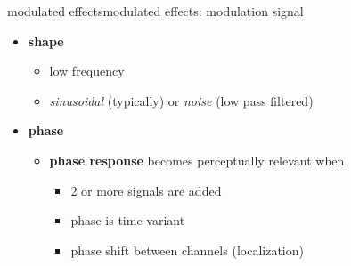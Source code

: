 \begin{frame}{modulated effects}{modulated effects: modulation signal}
	\begin{itemize}
		\item	\textbf{shape}
			\begin{itemize}
				\item	low frequency 
				\item	\textit{sinusoidal} (typically) or \textit{noise} (low pass filtered)
				
			\end{itemize}
		\pause
        \bigskip
		\item	\textbf{phase}
			\begin{itemize}
				\item	\textbf{phase response} becomes perceptually relevant when
                    \begin{itemize}
                        \item   2 or more signals are added
                        \item   phase is time-variant
                        \item   phase shift between channels (localization)
                    \end{itemize}
			\end{itemize}
	\end{itemize}
\end{frame}

